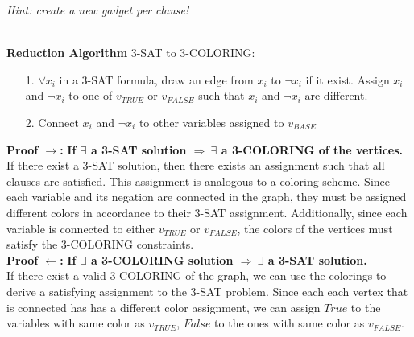 \documentclass[11pt]{article}
\begin{document}
\begin{subparts}
\emph{Hint: create a new gadget per clause!}\\
\begin{solution}\\
    \textbf{Reduction Algorithm } 3-SAT to 3-COLORING:
    \begin{itemize}
        \item[1.] $\forall x_i$ in a 3-SAT formula, draw an edge from $x_i$ to $\lnot x_i$ if it exist. Assign $x_i$ and $\lnot x_i$ to one of $v_{TRUE}$ or $v_{FALSE}$ such that $x_i$ and $\lnot x_i$ are different.
        \item[2.] Connect $x_i$ and $\lnot x_i$ to other variables assigned to $v_{BASE}$
    \end{itemize}
    \textbf{Proof $\rightarrow$: } \textbf{If $\exists$ a 3-SAT solution $\Rightarrow ~\exists$ a 3-COLORING of the vertices.}\\
    If there exist a 3-SAT solution, then there exists an assignment such that all clauses are satisfied. This assignment is analogous to a coloring scheme. Since each variable and its negation are 
    connected in the graph, they must be assigned different colors in accordance to their 3-SAT assignment. Additionally, since each variable
    is connected to either $v_{TRUE}$ or $v_{FALSE}$, the colors of the vertices must satisfy the 3-COLORING constraints.\\
    \textbf{Proof $\leftarrow$: } \textbf{If $\exists$ a 3-COLORING solution $\Rightarrow ~\exists$ a 3-SAT solution.}\\
    If there exist a valid 3-COLORING of the graph, we can use the colorings to derive a satisfying assignment to the 3-SAT problem. Since each each vertex that is connected has 
    has a different color assignment, we can assign $True$ to the variables with same color as $v_{TRUE}$, $False$ to the ones 
    with same color as $v_{FALSE}$.
\end{solution}
\end{subparts}
\end{document}
